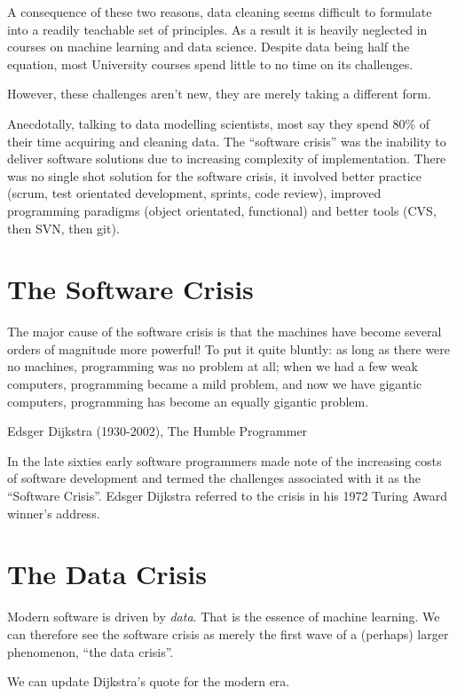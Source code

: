 \documentclass[a4paper]{caesar_book}
\begin{document}
A consequence of these two reasons, data cleaning seems difficult to formulate into a readily teachable set of principles. As a result it is heavily neglected in courses on machine learning and data science. Despite data being half the equation, most University courses spend little to no time on its challenges.

However, these challenges aren't new, they are merely taking a different form.

Anecdotally, talking to data modelling scientists, most say they spend 80\% of their time acquiring and cleaning data. The “software crisis” was the inability to deliver software solutions due to increasing complexity of implementation. There was no single shot solution for the software crisis, it involved better practice (scrum, test orientated development, sprints, code review), improved programming paradigms (object orientated, functional) and better tools (CVS, then SVN, then git).

\section{The Software Crisis}
\begin{displayquote}
The major cause of the software crisis is that the machines have become several orders of magnitude more powerful! To put it quite bluntly: as long as there were no machines, programming was no problem at all; when we had a few weak computers, programming became a mild problem, and now we have gigantic computers, programming has become an equally gigantic problem.

Edsger Dijkstra (1930-2002), The Humble Programmer
\end{displayquote}

In the late sixties early software programmers made note of the increasing costs of software development and termed the challenges associated with it as the ``Software Crisis''. Edsger Dijkstra referred to the crisis in his 1972 Turing Award winner's address.

\section{The Data Crisis}

Modern software is driven by \textit{data}. That is the essence of machine learning. We can therefore see the software crisis as merely the first wave of a (perhaps) larger phenomenon, ``the data crisis''.

We can update Dijkstra's quote for the modern era.
\end{document}
